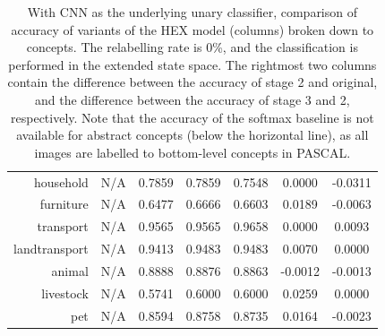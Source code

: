 \documentclass[11pt,a4paper]{book}
\begin{document}
\begin{table}[htbp]
\begin{tabular}{r|c|c|c|c|c|c}
household     & N/A    & 0.7859 & 0.7859 & 0.7548 & 0.0000 & -0.0311\\
furniture     & N/A    & 0.6477 & 0.6666 & 0.6603 & 0.0189 & -0.0063\\
transport     & N/A    & 0.9565 & 0.9565 & 0.9658 & 0.0000 & 0.0093\\
landtransport & N/A    & 0.9413 & 0.9483 & 0.9483 & 0.0070 & 0.0000\\
animal        & N/A    & 0.8888 & 0.8876 & 0.8863 & -0.0012 & -0.0013\\
livestock     & N/A    & 0.5741 & 0.6000 & 0.6000 & 0.0259 & 0.0000\\
pet           & N/A    & 0.8594 & 0.8758 & 0.8735 & 0.0164 & -0.0023
\end{tabular}
\caption{With CNN as the underlying unary classifier, comparison of accuracy of variants of the HEX model (columns) broken down to concepts. The relabelling rate is 0\%, and the classification is performed in the extended state space. The rightmost two columns contain the difference between the accuracy of stage 2 and original, and the difference between the accuracy of stage 3 and 2, respectively. Note that the accuracy of the softmax baseline is not available for abstract concepts (below the horizontal line), as all images are labelled to bottom-level concepts in PASCAL.}
\label{tab:cnn0acc}
\end{table}
\end{document}
